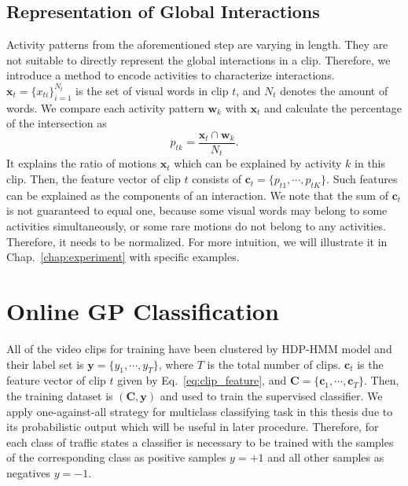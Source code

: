 \subsection*{Representation of Global Interactions} 
Activity patterns from the aforementioned step are varying in length. They are not suitable to directly represent the global interactions in a clip. 
Therefore, we introduce a method to encode activities to characterize interactions.
$\mathbf{x}_t=\{x_{ti}\}_{i=1}^{N_t}$ is the set of visual words in clip $t$, and $N_t$ denotes the amount of words. We compare each activity pattern $\mathbf{w}_k$ with $\mathbf{x}_t$ and calculate the percentage of the intersection as
\begin{equation}
	p_{tk} = \frac{\mathbf{x}_t \cap\mathbf{w}_k}{N_t}.
	\label{eq:clip_feature}
\end{equation}
It explains the ratio of motions $\mathbf{x}_t$ which can be explained by activity $k$ in this clip. Then, the feature vector of clip $t$ consists of $\mathbf{c}_t=\{p_{t1},\cdots,p_{tK}\}$. Such features can be explained as the components of an interaction. We note that the sum of $\mathbf{c}_t$ is not guaranteed to equal one, because some visual words may belong to some activities simultaneously, or some rare motions do not belong to any activities. Therefore, it needs to be normalized.
For more intuition, we will illustrate it in Chap.~\ref{chap:experiment} with specific examples.


\section{Online GP Classification}
\label{framework:gpc}

All of the video clips for training have been clustered by HDP-HMM model and their label set is $\mathbf{y}=\{y_1,\cdots,y_T\}$, where $T$ is the total number of clips. $\mathbf{c}_t$ is the feature vector of clip $t$ given by Eq.~\eqref{eq:clip_feature}, and $\mathbf{C}=\{\mathbf{c}_1,\cdots,\mathbf{c}_T\}$. Then, the training dataset is $(\mathbf{C},\mathbf{y})$ and used to train the supervised classifier. We apply one-against-all strategy for multiclass classifying task in this thesis due to its probabilistic output which will be useful in later procedure. 
Therefore, for each class of traffic states a classifier is necessary to be trained with the samples of the corresponding class as positive samples $y=+1$ and all other samples as negatives $y=-1$.

